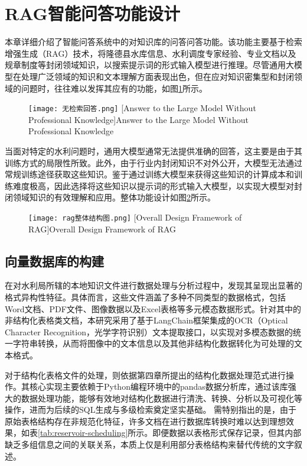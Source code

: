 \section{RAG智能问答功能设计}
本章详细介绍了智能问答系统中的对知识库的问答问答功能。该功能主要基于检索增强生成（RAG）技术，将隆德县水库信息、水利调度专家经验、专业文档以及规章制度等封闭领域知识，以搜索提示词的形式输入模型进行推理。尽管通用大模型在处理广泛领域的知识和文本理解方面表现出色，但在应对知识密集型和封闭领域的问题时，往往难以发挥其应有的功能，如图\ref{fig:无检索}所示。
\begin{figure}[!htb]
    \centering
    \texttt{[image: 无检索回答.png]}
    [Answer to the Large Model Without Professional Knowledge]{Answer to the Large Model Without Professional Knowledge}
    \label{fig:无检索}
\end{figure}
当面对特定的水利问题时，通用大模型通常无法提供准确的回答，这主要是由于其训练方式的局限性所致。此外，由于行业内封闭知识不对外公开，大模型无法通过常规训练途径获取这些知识。鉴于通过训练大模型来获得这些知识的计算成本和训练难度极高，因此选择将这些知识以提示词的形式输入大模型，以实现大模型对封闭领域知识的有效理解和应用。整体功能设计如图\ref{fig:rag整体结构图}所示。
\begin{figure}[h]
    \centering
    \texttt{[image: rag整体结构图.png]}
    [Overall Design Framework of RAG]{Overall Design Framework of RAG}
    \label{fig:rag整体结构图}
\end{figure}
\subsection{向量数据库的构建}
在对水利局所辖的本地知识文件进行数据处理与分析过程中，发现其呈现出显著的格式异构性特征。具体而言，这些文件涵盖了多种不同类型的数据格式，包括Word文档、PDF文件、图像数据以及Excel表格等多元模态数据形式。针对其中的非结构化表格类文档，本研究采用了基于LangChain框架集成的OCR\cite{sarzynska2021detecting,tian2016detecting}（Optical Character Recognition，光学字符识别）文本提取接口，以实现对多模态数据的统一字符串转换，从而将图像中的文本信息以及其他非结构化数据转化为可处理的文本格式。

对于结构化表格文件的处理，则依据第四章所提出的结构化数据处理范式进行操作。其核心实现主要依赖于Python编程环境中的pandas数据分析库，通过该库强大的数据处理功能，能够有效地对结构化数据进行清洗、转换、分析以及可视化等操作，进而为后续的SQL生成与多级检索奠定坚实基础。
需特别指出的是，由于原始表格结构存在非规范化特征，许多文档在进行数据库转换时难以达到理想效果，如表\ref{tab:reservoir-scheduling}所示。即便数据以表格形式保存记录，但其内部缺乏多组信息之间的关联关系，本质上仅是利用部分表格结构来替代传统的文字叙述。

